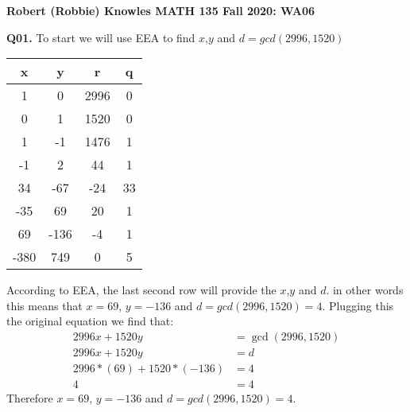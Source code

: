 \documentclass[11pt]{article}
\begin{document}
\parindent=0pt

\textbf{Robert (Robbie) Knowles MATH 135 Fall 2020: WA06}

\textbf{Q01.} To start we will use EEA to find $x$,$ y$ and $d = gcd(2996, 1520)$

\begin{center}
 \begin{tabular}{||c c c c||} 
 \hline
 x & y & r & q \\ [0.5ex] 
 \hline\hline
 1 & 0 & 2996 & 0 \\ 
 \hline
 0 & 1 & 1520 & 0 \\
 \hline
 1 & -1 & 1476 & 1 \\
 \hline
 -1 & 2 & 44 & 1 \\
 \hline
 34 &  -67 & -24 & 33 \\ 
 \hline
 -35 & 69  & 20 & 1 \\
 \hline
 69 &  -136 & -4 & 1 \\ 
 \hline
 -380 &  749 & 0 & 5\\ 
 \hline
\end{tabular}
\end{center}

According to EEA, the last second row will provide the $x$,$y$ and $d$. in other words this means that $x = 69$, $y = -136$ and $d= gcd(2996, 1520)=4$. Plugging this the original equation we find that:
\begin{align*}
2996x + 1520y &= \gcd(2996, 1520)\\
2996x + 1520y &= d \\
2996 * (69)+ 1520 * (-136) &= 4\\
4  &= 4
\end{align*}
Therefore  $x = 69$, $y = -136$ and $d= gcd(2996, 1520)=4$.\\
\end{document}
